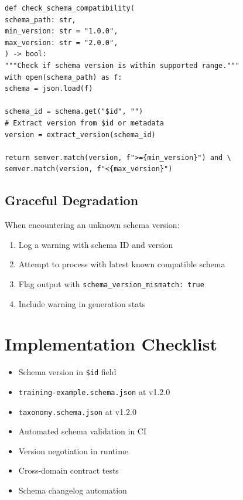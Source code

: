 \documentclass[12pt,a4paper,twoside]{report}
\begin{document}
\begin{lstlisting}[language=jsonx,caption={Version negotiation.}]
def check_schema_compatibility(
schema_path: str,
min_version: str = "1.0.0",
max_version: str = "2.0.0",
) -> bool:
"""Check if schema version is within supported range."""
with open(schema_path) as f:
schema = json.load(f)

schema_id = schema.get("$id", "")
# Extract version from $id or metadata
version = extract_version(schema_id)

return semver.match(version, f">={min_version}") and \
semver.match(version, f"<{max_version}")
\end{lstlisting}

\subsection{Graceful Degradation}

When encountering an unknown schema version:

\begin{enumerate}
\item Log a warning with schema ID and version
\item Attempt to process with latest known compatible schema
\item Flag output with \texttt{schema\_version\_mismatch: true}
\item Include warning in generation stats
\end{enumerate}

\section{Implementation Checklist}

\begin{itemize}
\item[\texttt{[x]}] Schema version in \texttt{\$id} field
\item[\texttt{[x]}] \texttt{training-example.schema.json} at v1.2.0
\item[\texttt{[x]}] \texttt{taxonomy.schema.json} at v1.2.0
\item[\texttt{[ ]}] Automated schema validation in CI
\item[\texttt{[ ]}] Version negotiation in runtime
\item[\texttt{[ ]}] Cross-domain contract tests
\item[\texttt{[ ]}] Schema changelog automation
\end{itemize}
\end{document}
